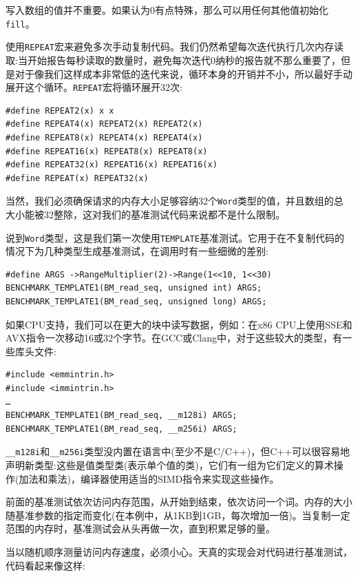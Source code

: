 写入数组的值并不重要。如果认为0有点特殊，那么可以用任何其他值初始化\texttt{fill}。

使用\texttt{REPEAT}宏来避免多次手动复制代码。我们仍然希望每次迭代执行几次内存读取:当开始报告每秒读取的数量时，避免每次迭代0纳秒的报告就不那么重要了，但是对于像我们这样成本非常低的迭代来说，循环本身的开销并不小，所以最好手动展开这个循环。\texttt{REPEAT}宏将循环展开32次:

\begin{lstlisting}[style=styleCXX]
#define REPEAT2(x) x x
#define REPEAT4(x) REPEAT2(x) REPEAT2(x)
#define REPEAT8(x) REPEAT4(x) REPEAT4(x)
#define REPEAT16(x) REPEAT8(x) REPEAT8(x)
#define REPEAT32(x) REPEAT16(x) REPEAT16(x)
#define REPEAT(x) REPEAT32(x)
\end{lstlisting}

当然，我们必须确保请求的内存大小足够容纳32个\texttt{Word}类型的值，并且数组的总大小能被32整除，这对我们的基准测试代码来说都不是什么限制。

说到\texttt{Word}类型，这是我们第一次使用\texttt{TEMPLATE}基准测试。它用于在不复制代码的情况下为几种类型生成基准测试，在调用时有一些细微的差别:

\begin{lstlisting}[style=styleCXX]
#define ARGS ->RangeMultiplier(2)->Range(1<<10, 1<<30)
BENCHMARK_TEMPLATE1(BM_read_seq, unsigned int) ARGS;
BENCHMARK_TEMPLATE1(BM_read_seq, unsigned long) ARGS;
\end{lstlisting}

如果CPU支持，我们可以在更大的块中读写数据，例如：在x86 CPU上使用SSE和AVX指令一次移动16或32个字节。在GCC或Clang中，对于这些较大的类型，有一些库头文件:

\begin{lstlisting}[style=styleCXX]
#include <emmintrin.h>
#include <immintrin.h>
…
BENCHMARK_TEMPLATE1(BM_read_seq, __m128i) ARGS;
BENCHMARK_TEMPLATE1(BM_read_seq, __m256i) ARGS;
\end{lstlisting}

\texttt{\_\_m128i}和\texttt{\_\_m256i}类型没内置在语言中(至少不是C/C++)，但C++可以很容易地声明新类型:这些是值类型类(表示单个值的类)，它们有一组为它们定义的算术操作(加法和乘法)，编译器使用适当的SIMD指令来实现这些操作。

前面的基准测试依次访问内存范围，从开始到结束，依次访问一个词。内存的大小随基准参数的指定而变化(在本例中，从1KB到1GB，每次增加一倍)。当复制一定范围的内存时，基准测试会从头再做一次，直到积累足够的量。

当以随机顺序测量访问内存速度，必须小心。天真的实现会对代码进行基准测试，代码看起来像这样:

